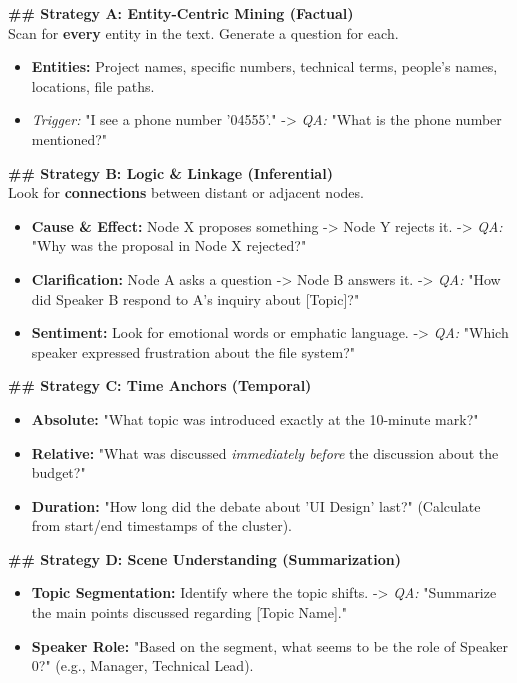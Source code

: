 \documentclass[11pt]{article}
\begin{document}
\begin{promptbox}
\vspace{0.5em}
\textbf{\#\# Strategy A: Entity-Centric Mining (Factual)}\\
Scan for \textbf{every} entity in the text. Generate a question for each.
\begin{itemize}[leftmargin=1.5em, nosep]
    \item \textbf{Entities:} Project names, specific numbers, technical terms, people's names, locations, file paths.
    \item \textit{Trigger:} "I see a phone number '04555'." -> \textit{QA:} "What is the phone number mentioned?"
\end{itemize}

\vspace{0.5em}
\textbf{\#\# Strategy B: Logic \& Linkage (Inferential)}\\
Look for \textbf{connections} between distant or adjacent nodes.
\begin{itemize}[leftmargin=1.5em, nosep]
    \item \textbf{Cause \& Effect:} Node X proposes something -> Node Y rejects it. -> \textit{QA:} "Why was the proposal in Node X rejected?"
    \item \textbf{Clarification:} Node A asks a question -> Node B answers it. -> \textit{QA:} "How did Speaker B respond to A's inquiry about [Topic]?"
    \item \textbf{Sentiment:} Look for emotional words or emphatic language. -> \textit{QA:} "Which speaker expressed frustration about the file system?"
\end{itemize}

\vspace{0.5em}
\textbf{\#\# Strategy C: Time Anchors (Temporal)}
\begin{itemize}[leftmargin=1.5em, nosep]
    \item \textbf{Absolute:} "What topic was introduced exactly at the 10-minute mark?"
    \item \textbf{Relative:} "What was discussed \textit{immediately before} the discussion about the budget?"
    \item \textbf{Duration:} "How long did the debate about 'UI Design' last?" (Calculate from start/end timestamps of the cluster).
\end{itemize}

\vspace{0.5em}
\textbf{\#\# Strategy D: Scene Understanding (Summarization)}
\begin{itemize}[leftmargin=1.5em, nosep]
    \item \textbf{Topic Segmentation:} Identify where the topic shifts. -> \textit{QA:} "Summarize the main points discussed regarding [Topic Name]."
    \item \textbf{Speaker Role:} "Based on the segment, what seems to be the role of Speaker 0?" (e.g., Manager, Technical Lead).
\end{itemize}


\end{promptbox}
\end{document}
